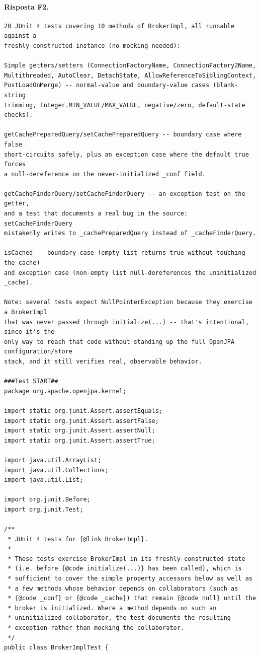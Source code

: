 \paragraph*{Risposta F2.}
\label{risposta:f2}
\begin{lstlisting}
20 JUnit 4 tests covering 10 methods of BrokerImpl, all runnable against a
freshly-constructed instance (no mocking needed):

Simple getters/setters (ConnectionFactoryName, ConnectionFactory2Name,
Multithreaded, AutoClear, DetachState, AllowReferenceToSiblingContext,
PostLoadOnMerge) -- normal-value and boundary-value cases (blank-string
trimming, Integer.MIN_VALUE/MAX_VALUE, negative/zero, default-state checks).

getCachePreparedQuery/setCachePreparedQuery -- boundary case where false
short-circuits safely, plus an exception case where the default true forces
a null-dereference on the never-initialized _conf field.

getCacheFinderQuery/setCacheFinderQuery -- an exception test on the getter,
and a test that documents a real bug in the source: setCacheFinderQuery
mistakenly writes to _cachePreparedQuery instead of _cacheFinderQuery.

isCached -- boundary case (empty list returns true without touching the cache)
and exception case (non-empty list null-dereferences the uninitialized _cache).

Note: several tests expect NullPointerException because they exercise a BrokerImpl
that was never passed through initialize(...) -- that's intentional, since it's the
only way to reach that code without standing up the full OpenJPA configuration/store
stack, and it still verifies real, observable behavior.

###Test START##
package org.apache.openjpa.kernel;

import static org.junit.Assert.assertEquals;
import static org.junit.Assert.assertFalse;
import static org.junit.Assert.assertNull;
import static org.junit.Assert.assertTrue;

import java.util.ArrayList;
import java.util.Collections;
import java.util.List;

import org.junit.Before;
import org.junit.Test;

/**
 * JUnit 4 tests for {@link BrokerImpl}.
 *
 * These tests exercise BrokerImpl in its freshly-constructed state
 * (i.e. before {@code initialize(...)} has been called), which is
 * sufficient to cover the simple property accessors below as well as
 * a few methods whose behavior depends on collaborators (such as
 * {@code _conf} or {@code _cache}) that remain {@code null} until the
 * broker is initialized. Where a method depends on such an
 * uninitialized collaborator, the test documents the resulting
 * exception rather than mocking the collaborator.
 */
public class BrokerImplTest {


\end{lstlisting}
